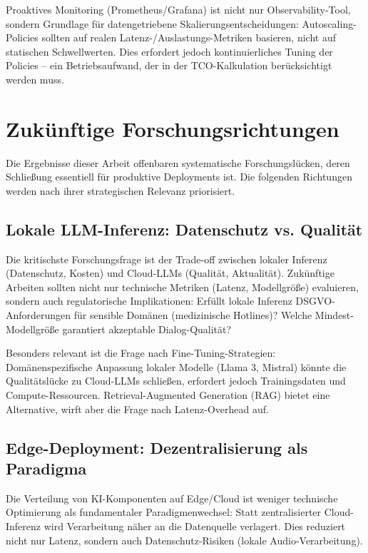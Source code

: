 Proaktives Monitoring (\acrshort{Prometheus}/\acrshort{Grafana}) ist nicht nur Observability-Tool, sondern Grundlage für datengetriebene Skalierungsentscheidungen: Autoscaling-Policies sollten auf realen Latenz-/Auslastungs-Metriken basieren, nicht auf statischen Schwellwerten. Dies erfordert jedoch kontinuierliches Tuning der Policies -- ein Betriebsaufwand, der in der TCO-Kalkulation berücksichtigt werden muss.

\section{Zukünftige Forschungsrichtungen}

Die Ergebnisse dieser Arbeit offenbaren systematische Forschungslücken, deren Schließung essentiell für produktive Deployments ist. Die folgenden Richtungen werden nach ihrer strategischen Relevanz priorisiert.

\subsection{Lokale LLM-Inferenz: Datenschutz vs. Qualität}

Die kritischste Forschungsfrage ist der Trade-off zwischen lokaler Inferenz (Datenschutz, Kosten) und Cloud-\acrshort{LLM}s (Qualität, Aktualität). Zukünftige Arbeiten sollten nicht nur technische Metriken (Latenz, Modellgröße) evaluieren, sondern auch regulatorische Implikationen: Erfüllt lokale Inferenz \acrshort{DSGVO}-Anforderungen für sensible Domänen (medizinische Hotlines)? Welche Mindest-Modellgröße garantiert akzeptable Dialog-Qualität?

Besonders relevant ist die Frage nach Fine-Tuning-Strategien: Domänenspezifische Anpassung lokaler Modelle (Llama 3, Mistral) könnte die Qualitätslücke zu Cloud-\acrshort{LLM}s schließen, erfordert jedoch Trainingsdaten und Compute-Ressourcen. Retrieval-Augmented Generation (RAG) bietet eine Alternative, wirft aber die Frage nach Latenz-Overhead auf.

\subsection{Edge-Deployment: Dezentralisierung als Paradigma}

Die Verteilung von \acrshort{KI}-Komponenten auf Edge/Cloud ist weniger technische Optimierung als fundamentaler Paradigmenwechsel: Statt zentralisierter Cloud-Inferenz wird Verarbeitung näher an die Datenquelle verlagert. Dies reduziert nicht nur Latenz, sondern auch Datenschutz-Risiken (lokale Audio-Verarbeitung).

